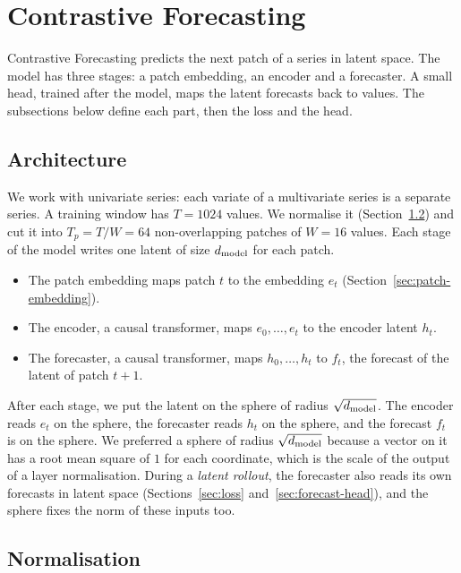 \section{Contrastive Forecasting}
\label{sec:method}

Contrastive Forecasting predicts the next patch of a series in latent
space. The model has three stages: a patch embedding, an encoder and a
forecaster. A small head, trained after the model, maps the latent
forecasts back to values. The subsections below define each part, then
the loss and the head.

\subsection{Architecture}
\label{sec:architecture}

We work with univariate series: each variate of a multivariate series
is a separate series. A training window has $T = 1024$ values. We
normalise it (Section~\ref{sec:normalisation}) and cut it into
$T_p = T / W = 64$ non-overlapping patches of $W = 16$ values. Each
stage of the model writes one latent of size $d_{\mathrm{model}}$ for each patch.
\begin{itemize}
\item The patch embedding maps patch $t$ to the embedding $e_t$
  (Section~\ref{sec:patch-embedding}).
\item The encoder, a causal transformer, maps $e_0, \ldots, e_t$ to
  the encoder latent $h_t$.
\item The forecaster, a causal transformer, maps $h_0, \ldots, h_t$ to
  $f_t$, the forecast of the latent of patch $t + 1$.
\end{itemize}

After each stage, we put the latent on the sphere of radius
$\sqrt{d_{\mathrm{model}}}$. The encoder reads $e_t$ on the sphere, the forecaster
reads $h_t$ on the sphere, and the forecast $f_t$ is on the sphere. We
preferred a sphere of radius $\sqrt{d_{\mathrm{model}}}$ because a vector on it has a
root mean square of $1$ for each coordinate, which is the scale of the
output of a layer normalisation. During a \emph{latent rollout}, the
forecaster also reads its own forecasts in latent space
(Sections~\ref{sec:loss} and~\ref{sec:forecast-head}), and the sphere
fixes the norm of these inputs too.

\subsection{Normalisation}
\label{sec:normalisation}

